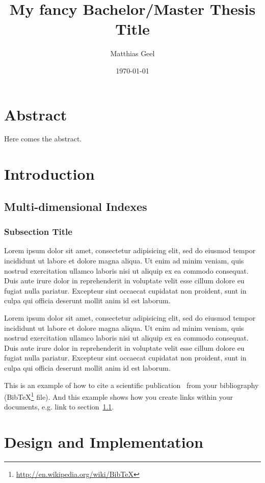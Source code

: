\documentclass[11pt,a4paper]{globis-book}
\title{My fancy Bachelor/Master Thesis Title}
\author{Matthias Geel}
\institute{Institute of Information Systems}
\date{\today}
\begin{document}
\frontmatter
\maketitlepage
\cleardoublepage
{}

\chapter*{Abstract}

Here comes the abstract.

\tableofcontents

\mainmatter


\chapter{Introduction}
\section{Multi-dimensional Indexes}
\label{sec:title}

\subsection{Subsection Title}
Lorem ipsum dolor sit amet, consectetur adipisicing elit, sed do eiusmod
tempor incididunt ut labore et dolore magna aliqua. Ut enim ad minim veniam,
quis nostrud exercitation ullamco laboris nisi ut aliquip ex ea commodo
consequat. Duis aute irure dolor in reprehenderit in voluptate velit esse
cillum dolore eu fugiat nulla pariatur. Excepteur sint occaecat cupidatat non
proident, sunt in culpa qui officia deserunt mollit anim id est laborum.

Lorem ipsum dolor sit amet, consectetur adipisicing elit, sed do eiusmod
tempor incididunt ut labore et dolore magna aliqua. Ut enim ad minim veniam,
quis nostrud exercitation ullamco laboris nisi ut aliquip ex ea commodo
consequat. Duis aute irure dolor in reprehenderit in voluptate velit esse
cillum dolore eu fugiat nulla pariatur. Excepteur sint occaecat cupidatat non
proident, sunt in culpa qui officia deserunt mollit anim id est laborum.

This is an example of how to cite a scientific publication~\cite{murolo2013} from your bibliography (BibTeX\footnote{\url{http://en.wikipedia.org/wiki/BibTeX}} file). And this example shows how you create links within your documents, e.g. link to section~\ref{sec:title}.

\chapter{Design and Implementation}
\end{document}
